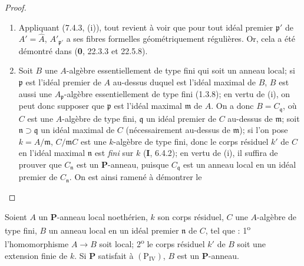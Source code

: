 \begin{proof}
\begin{enumerate}
\item[(i)] Appliquant (7.4.3, (i)), tout revient à voir que pour tout
idéal premier $\mathfrak p'$ de $A'=\widehat A$,
$A'_{\mathfrak p'}$ a ses fibres formelles géométriquement régulières. Or,
cela a été démontré dans (\textbf{0}, 22.3.3 et 22.5.8).


\item[(ii)] Soit $B$ une $A$-algèbre essentiellement de type fini qui
soit un anneau local; si $\mathfrak p$ est l'idéal premier de $A$ au-dessus
duquel est l'idéal maximal de $B$, $B$ est aussi une
$A_{\mathfrak p}$-algèbre essentiellement de type fini (1.3.8); en vertu de
(i), on peut donc supposer que $\mathfrak p$ est l'idéal maximal $\mathfrak m$
de $A$. On a donc $B=C_{\mathfrak q}$, où $C$ est une $A$-algèbre de type
fini, $\mathfrak q$ un idéal premier de $C$ au-dessus de $\mathfrak m$; soit
$\mathfrak n\supset\mathfrak q$ un idéal maximal de $C$ (nécessairement
au-dessus de $\mathfrak m$); si l'on pose $k=A/\mathfrak m$,
$C/\mathfrak mC$ est une $k$-algèbre de type fini, donc le corps résiduel
$k'$ de $C$ en l'idéal maximal $\mathfrak n$ est \emph{fini} sur $k$ (\textbf{I}, 6.4.2);
en vertu de (i), il suffira de prouver que $C_{\mathfrak n}$ est un
$\boldsymbol P$-anneau, puisque $C_{\mathfrak q}$ est un anneau local en un
idéal premier de $C_{\mathfrak n}$. On est ainsi ramené à démontrer le
\end{enumerate}
\end{proof}

\begin{lemma}[7.4.4.1]
\label{IV.2.s7.4.4.1-fr}
Soient $A$ un $\boldsymbol P$-anneau local noethérien, $k$ son corps
résiduel, $C$ une $A$-algèbre de type fini, $B$ un anneau local en un idéal
premier $\mathfrak n$ de $C$, tel que : 1\textsuperscript{o}
l'homomorphisme $A\to B$ soit local; 2\textsuperscript{o} le corps résiduel
$k'$ de $B$ soit une extension finie de $k$. Si $\boldsymbol P$ satisfait à
$(\mathrm P_{\mathrm{IV}})$, $B$ est un $\boldsymbol P$-anneau.
\end{lemma}

